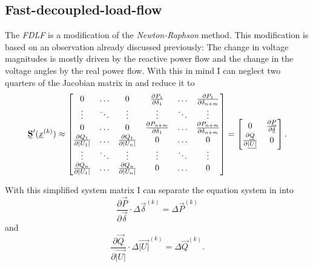 \subsection{Fast-decoupled-load-flow}
\label{sec:fdlf}

The \emph{FDLF} \cite{fdlf} is a modification of the \emph{Newton-Raphson} method. This modification is based on an observation already discussed previously: The change in voltage magnitudes is mostly driven by the reactive power flow and the change in the voltage angles by the real power flow. With this in mind I can neglect two quarters of the Jacobian matrix in  and reduce it to
\begin{equation}
	\mat S' (\vec x^{(k)}) \approx 
	\begin{bmatrix}
		0	& \hdots	& 0	& \frac{\partial P_1}{\partial \delta_1}	& \hdots	& \frac{\partial P_1}{\partial \delta_{n + m}} \\
		\vdots								& \ddots	& \vdots								& \vdots									& \ddots	& \vdots \\
		0	& \hdots	& 0	& \frac{\partial P_{n + m}}{\partial \delta_1}	& \hdots	& \frac{\partial P_{n + m}}{\partial \delta_{n + m}} \\
		\frac{\partial Q_1}{\partial |U_1|}	& \hdots	& \frac{\partial Q_1}{\partial |U_n|}	& 0	& \hdots	& 0 \\
		\vdots								& \ddots	& \vdots								& \vdots									& \ddots	& \vdots \\
		\frac{\partial Q_n}{\partial |U_1|}	& \hdots	& \frac{\partial Q_n}{\partial |U_n|}	& 0	& \hdots	& 0
	\end{bmatrix} =
	\begin{bmatrix}
		0								&	\frac{\partial \vec P}{\partial \vec \delta} \\
		\frac{\partial \vec Q}{\partial \vec{|U|}}	&	0
	\end{bmatrix}.
\end{equation}

With this simplified system matrix I can separate the equation system in  into
\begin{equation}
	\frac{\partial \vec P}{\partial \vec \delta} \cdot \Delta \vec \delta^{(k)} = \Delta \vec P^{(k)}
\end{equation}
and
\begin{equation}
	\frac{\partial \vec Q}{\partial \vec{|U|}} \cdot \Delta \vec{|U|}^{(k)} = \Delta \vec Q^{(k)}.
\end{equation}

